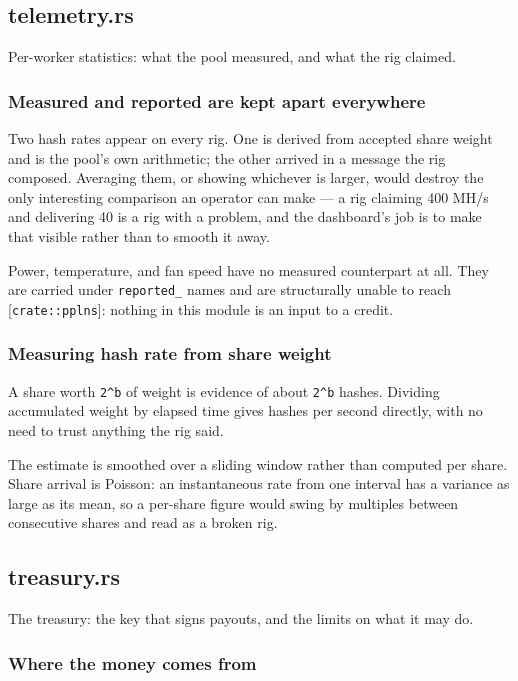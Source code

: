 \documentclass[11pt,a4paper]{article}
\begin{document}
\subsection{telemetry.rs}
Per-worker statistics: what the pool measured, and what the rig claimed.

\subsubsection{Measured and reported are kept apart everywhere}

Two hash rates appear on every rig. One is derived from accepted share
weight and is the pool's own arithmetic; the other arrived in a message the
rig composed. Averaging them, or showing whichever is larger, would destroy
the only interesting comparison an operator can make — a rig claiming 400
MH/s and delivering 40 is a rig with a problem, and the dashboard's job is
to make that visible rather than to smooth it away.

Power, temperature, and fan speed have no measured counterpart at all. They
are carried under \texttt{reported\_} names and are structurally unable to reach
[\texttt{crate::pplns}]: nothing in this module is an input to a credit.

\subsubsection{Measuring hash rate from share weight}

A share worth \texttt{2\textasciicircum{}b} of weight is evidence of about \texttt{2\textasciicircum{}b} hashes. Dividing
accumulated weight by elapsed time gives hashes per second directly, with no
need to trust anything the rig said.

The estimate is smoothed over a sliding window rather than computed per
share. Share arrival is Poisson: an instantaneous rate from one interval has
a variance as large as its mean, so a per-share figure would swing by
multiples between consecutive shares and read as a broken rig.

\subsection{treasury.rs}
The treasury: the key that signs payouts, and the limits on what it may do.

\subsubsection{Where the money comes from}
\end{document}
